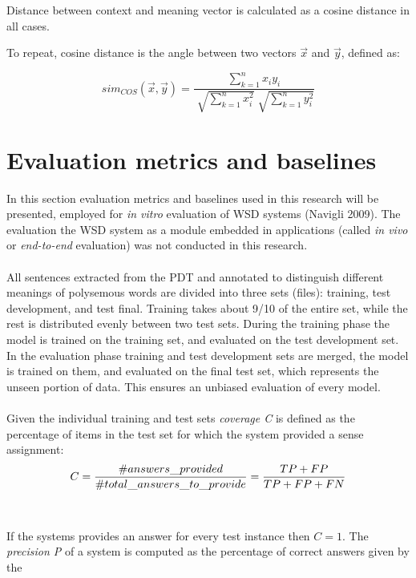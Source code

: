 Distance between context and 
meaning vector is calculated as a cosine distance in all cases.

To repeat, cosine distance is  the angle between two vectors $\vec x$ and $\vec y$, defined as:
\begin{center}
\large{
\begin{equation}sim_{COS}(\vec x ,\vec y) =  \frac{\sum_{k=1}^n x_{i}y_{i} }{\sqrt []{\sum_{k=1}^n x_{i}^{2}} \sqrt []{\sum_{k=1}^n y_{i}^{2}}} 
\end{equation} 
}
\end{center}

\section{Evaluation metrics and baselines}
In this section evaluation metrics and baselines used in this research will be presented, employed for 
\textit{in vitro} evaluation of WSD systems (Navigli 2009). The evaluation the WSD system as a module 
embedded in applications (called \textit{in vivo} or \textit{end-to-end} evaluation) was not conducted 
in this research.  
\\\\
All sentences extracted from the PDT and annotated to distinguish different meanings of polysemous
words are divided into three sets (files): training, test development, and test final. Training takes about
9/10 of the entire set, while the rest is distributed evenly between two test sets. During the training 
phase the model is trained on the training set, and evaluated on the test development set. In the evaluation
phase training and test development sets are merged, the model is trained on them, and evaluated on the
final test set, which represents the unseen portion of data. This ensures an unbiased evaluation of every
model.
\\\\
Given the individual training and test sets \textit{coverage C} is defined as the percentage
of items in the test set for which the system provided a sense assignment:
\begin{equation}
\large{C=\frac{\#answers\_provided}{\#total\_answers\_to\_provide}=\frac{TP+FP}{TP+FP+FN}
}
\end{equation}
\\\\
If the systems provides an answer for every test instance then $C=1$.
The \textit{precision P} of a system is computed as the percentage of correct answers given by the 
